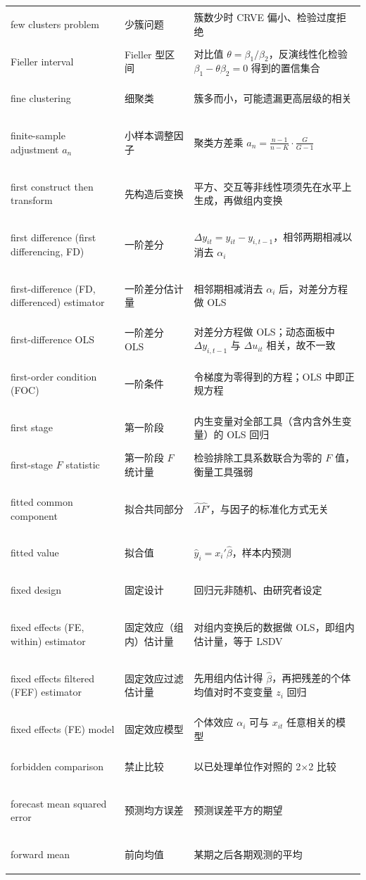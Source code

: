 \begin{longtable}{@{}>{\bfseries\boldmath\raggedright\arraybackslash}p{4.6cm}>{\raggedright\arraybackslash}p{3.2cm}>{\raggedright\arraybackslash}p{\dimexpr\textwidth-7.8cm-4\tabcolsep\relax}@{}}
few clusters problem & 少簇问题 & 簇数少时 CRVE 偏小、检验过度拒绝 \\
Fieller interval & Fieller 型区间 & 对比值 $\theta=\beta_1/\beta_2$，反演线性化检验 $\beta_1-\theta\beta_2=0$ 得到的置信集合 \\
fine clustering & 细聚类 & 簇多而小，可能遗漏更高层级的相关 \\
finite-sample adjustment $a_n$ & 小样本调整因子 & 聚类方差乘 $a_n=\frac{n-1}{n-K}\cdot\frac{G}{G-1}$ \\
first construct then transform & 先构造后变换 & 平方、交互等非线性项须先在水平上生成，再做组内变换 \\
first difference (first differencing, FD) & 一阶差分 & $\Delta y_{it}=y_{it}-y_{i,t-1}$，相邻两期相减以消去 $\alpha_i$ \\
first-difference (FD, differenced) estimator & 一阶差分估计量 & 相邻期相减消去 $\alpha_i$ 后，对差分方程做 OLS \\
first-difference OLS & 一阶差分 OLS & 对差分方程做 OLS；动态面板中 $\Delta y_{i,t-1}$ 与 $\Delta u_{it}$ 相关，故不一致 \\
first-order condition (FOC) & 一阶条件 & 令梯度为零得到的方程；OLS 中即正规方程 \\
first stage & 第一阶段 & 内生变量对全部工具（含内含外生变量）的 OLS 回归 \\
first-stage $F$ statistic & 第一阶段 $F$ 统计量 & 检验排除工具系数联合为零的 $F$ 值，衡量工具强弱 \\
fitted common component & 拟合共同部分 & $\hat\Lambda\hat F'$，与因子的标准化方式无关 \\
fitted value & 拟合值 & $\hat y_i=x_i'\hat\beta$，样本内预测 \\
fixed design & 固定设计 & 回归元非随机、由研究者设定 \\
fixed effects (FE, within) estimator & 固定效应（组内）估计量 & 对组内变换后的数据做 OLS，即组内估计量，等于 LSDV \\
fixed effects filtered (FEF) estimator & 固定效应过滤估计量 & 先用组内估计得 $\hat\beta$，再把残差的个体均值对时不变变量 $z_i$ 回归 \\
fixed effects (FE) model & 固定效应模型 & 个体效应 $\alpha_i$ 可与 $x_{it}$ 任意相关的模型 \\
forbidden comparison & 禁止比较 & 以已处理单位作对照的 2$\times$2 比较 \\
forecast mean squared error & 预测均方误差 & 预测误差平方的期望 \\
forward mean & 前向均值 & 某期之后各期观测的平均 \\

\end{longtable}
